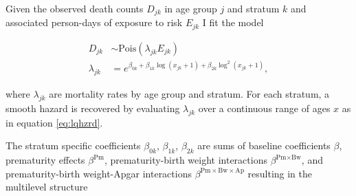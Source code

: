 \documentclass[10pt,twoside,reqno]{article}
\begin{document}
Given the observed death counts \(D_{jk}\) in age group \(j\) and stratum \(k\) and associated person-days of exposure to risk \(E_{jk}\) I fit the model

\begin{equation}
  \begin{aligned}
    D_{jk} &\sim \text{Pois}\left(\lambda_{jk}E_{jk}\right) \\
    \lambda_{jk} &= e^{\beta_{0k} +
    \beta_{1k}\log(x_{jk}+1) +
    \beta_{2k}\log^2(x_{jk}+1)},
  \end{aligned}
\label{eq:themodel}
\end{equation}

where \(\lambda_{jk}\) are mortality rates by age group and stratum. For each stratum, a smooth hazard is recovered by evaluating \(\lambda_{jk}\) over a continuous range of ages \(x\) as in equation \eqref{eq:lqhzrd}.

The stratum specific coefficients \(\beta_{0k}\), \(\beta_{1k}\), \(\beta_{2k}\) are sums of baseline coefficients \(\beta\), prematurity effects \(\beta^\text{Pm}\), prematurity-birth weight interactions \(\beta^{\text{Pm}\times\text{Bw}}\), and prematurity-birth weight-Apgar interactions \(\beta^{\text{Pm}\times\text{Bw}\times\text{Ap}}\) resulting in the multilevel structure
\end{document}
